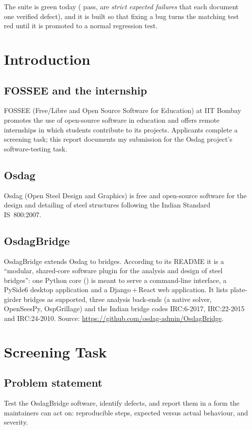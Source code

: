 \documentclass[11pt,a4paper]{report}
\newcommand{\code}[1]{\texttt{\detokenize{#1}}}
\newcommand{\repo}{\url{https://github.com/osdag-admin/OsdagBridge}}
\begin{document}
The suite is green today (\npass{} pass, \nxfail{} are \emph{strict expected failures} that each document one
verified defect), and it is built so that fixing a bug turns the matching test red until it is promoted to a
normal regression test.

\tableofcontents

\chapter{Introduction}
\section{FOSSEE and the internship}
FOSSEE (Free/Libre and Open Source Software for Education) at IIT Bombay promotes the use of open-source software
in education and offers remote internships in which students contribute to its projects. Applicants complete a
screening task; this report documents my submission for the Osdag project's software-testing task.

\section{Osdag}
Osdag (Open Steel Design and Graphics) is free and open-source software for the design and detailing of steel
structures following the Indian Standard IS~800:2007.

\section{OsdagBridge}
OsdagBridge extends Osdag to bridges. According to its README it is a ``modular, shared-core software plugin for the
analysis and design of steel bridges'': one Python core (\code{osdagbridge.core}) is meant to serve a command-line
interface, a PySide6 desktop application and a Django\,+\,React web application. It lists plate-girder bridges as
supported, three analysis back-ends (a native solver, OpenSeesPy, OspGrillage) and the Indian bridge codes
IRC:6-2017, IRC:22-2015 and IRC:24-2010. Source: \repo.

\chapter{Screening Task}
\section{Problem statement}
Test the OsdagBridge software, identify defects, and report them in a form the maintainers can act on:
reproducible steps, expected versus actual behaviour, and severity.
\end{document}
